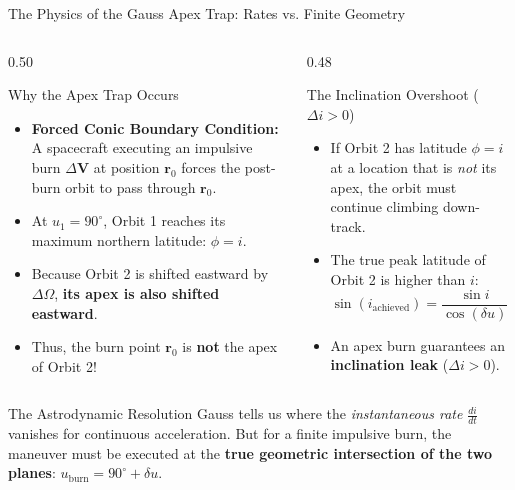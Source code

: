 \documentclass[aspectratio=169,10pt]{beamer}
\begin{document}
\begin{frame}{The Physics of the Gauss Apex Trap: Rates vs. Finite Geometry}
    \begin{columns}[t]
        \begin{column}{0.50\textwidth}
            \begin{block}{Why the Apex Trap Occurs}
                \scriptsize
                \begin{itemize}\setlength{\itemsep}{3pt}
                    \item \textbf{Forced Conic Boundary Condition:} A spacecraft executing an impulsive burn $\Delta\mathbf{V}$ at position $\mathbf{r}_0$ forces the post-burn orbit to pass through $\mathbf{r}_0$.
                    \item At $u_1 = 90^\circ$, Orbit 1 reaches its maximum northern latitude: $\phi = i$.
                    \item Because Orbit 2 is shifted eastward by $\Delta\Omega$, \textbf{its apex is also shifted eastward}.
                    \item Thus, the burn point $\mathbf{r}_0$ is \textbf{not} the apex of Orbit 2!
                \end{itemize}
            \end{block}
        \end{column}
        
        \begin{column}{0.48\textwidth}
            \begin{alertblock}{The Inclination Overshoot ($\Delta i > 0$)}
                \scriptsize
                \begin{itemize}\setlength{\itemsep}{3pt}
                    \item If Orbit 2 has latitude $\phi = i$ at a location that is \textit{not} its apex, the orbit must continue climbing down-track.
                    \item The true peak latitude of Orbit 2 is higher than $i$:
                    $$\sin(i_{\text{achieved}}) = \frac{\sin i}{\cos(\delta u)} > \sin i \implies \mathbf{i_{\text{achieved}} > i}$$
                    \item An apex burn guarantees an \textbf{inclination leak} ($\Delta i > 0$).
                \end{itemize}
            \end{alertblock}
        \end{column}
    \end{columns}
    \vspace{0.1cm}
    \begin{exampleblock}{The Astrodynamic Resolution}
        \scriptsize
        Gauss tells us where the \textit{instantaneous rate} $\frac{di}{dt}$ vanishes for continuous acceleration. But for a finite impulsive burn, the maneuver must be executed at the \textbf{true geometric intersection of the two planes}: $u_{\text{burn}} = 90^\circ + \delta u$.
    \end{exampleblock}
\end{frame}
\end{document}
